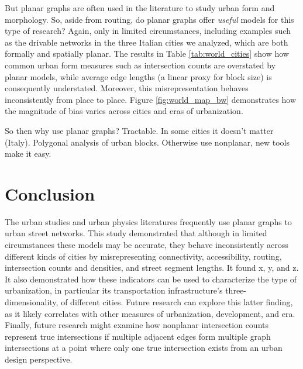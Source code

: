 \documentclass[Afour,sageh,times]{sagej}
\begin{document}
But planar graphs are often used in the literature to study urban form and morphology. So, aside from routing, do planar graphs offer \emph{useful} models for this type of research? Again, only in limited circumstances, including examples such as the drivable networks in the three Italian cities we analyzed, which are both formally and spatially planar. The results in Table \ref{tab:world_cities} show how common urban form measures such as intersection counts are overstated by planar models, while average edge lengths (a linear proxy for block size) is consequently understated. Moreover, this misrepresentation behaves inconsistently from place to place. Figure \ref{fig:world_map_bw} demonstrates how the magnitude of bias varies across cities and eras of urbanization.

So then why use planar graphs? Tractable. In some cities it doesn't matter (Italy). Polygonal analysis of urban blocks. Otherwise use nonplanar, new tools make it easy.


\section{Conclusion}

The urban studies and urban physics literatures frequently use planar graphs to urban street networks. This study demonstrated that although in limited circumstances these models may be accurate, they behave inconsistently across different kinds of cities by misrepresenting connectivity, accessibility, routing, intersection counts and densities, and street segment lengths. It found x, y, and z. It also demonstrated how these indicators can be used to characterize the type of urbanization, in particular its transportation infrastructure's three-dimensionality, of different cities. Future research can explore this latter finding, as it likely correlates with other measures of urbanization, development, and era. Finally, future research might examine how nonplanar intersection counts represent true intersections if multiple adjacent edges form multiple graph intersections at a point where only one true intersection exists from an urban design perspective.




\end{document}
